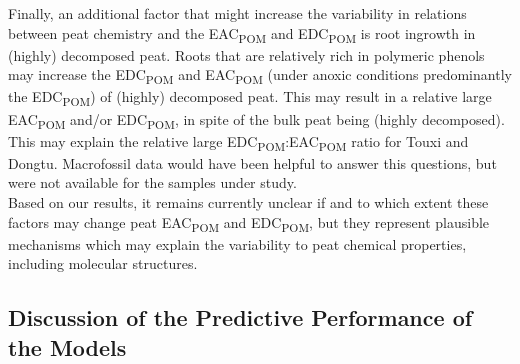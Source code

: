 \documentclass[alpha-refs]{wiley-article-rmd}
\begin{document}
\begin{refsection}
Finally, an additional factor that might increase the variability in relations between peat chemistry and the EAC\textsubscript{POM} and EDC\textsubscript{POM} is root ingrowth in (highly) decomposed peat. Roots that are relatively rich in polymeric phenols \autocite{Moore.2007,Scheffer.2000} may increase the EDC\textsubscript{POM} and EAC\textsubscript{POM} (under anoxic conditions predominantly the EDC\textsubscript{POM}) of (highly) decomposed peat. This may result in a relative large EAC\textsubscript{POM} and/or EDC\textsubscript{POM}, in spite of the bulk peat being (highly decomposed). This may explain the relative large EDC\textsubscript{POM}:EAC\textsubscript{POM} ratio for Touxi and Dongtu. Macrofossil data would have been helpful to answer this questions, but were not available for the samples under study.\\
Based on our results, it remains currently unclear if and to which extent these factors may change peat EAC\textsubscript{POM} and EDC\textsubscript{POM}, but they represent plausible mechanisms which may explain the variability to peat chemical properties, including molecular structures.

\hypertarget{discussion-of-the-predictive-performance-of-the-models}{%
\subsection{Discussion of the Predictive Performance of the Models}\label{discussion-of-the-predictive-performance-of-the-models}}


\end{refsection}
\end{document}

